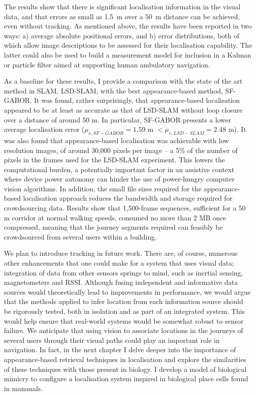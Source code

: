 The results show that there is significant localisation information in the visual data, and that errors as small as \SI{1.5}{m} over a \SI{50}{m} distance can be achieved, even without tracking. As mentioned above, the results have been reported in two ways: a) average absolute positional errors, and b) error distributions, both of which allow image descriptions to be assessed for their localisation capability.  The latter could also be used to build a measurement model for inclusion in a Kalman or particle filter  aimed at supporting human ambulatory navigation. 

As a baseline for these results, I provide a comparison with the state of the art method in SLAM, LSD-SLAM, with the best appearance-based method, SF-GABOR. It was found, rather surprisingly, that appearance-based localisation appeared to be at least as accurate as that of LSD-SLAM without loop closure over a distance of around 50 m. In particular, SF-GABOR presents a lower average localisation error ($\mu_{e,SF-GABOR} = 1.59 $ m $< \mu_{e,LSD-SLAM} = 2.48 $ m). It was also found that a\-ppea\-rance\--based localisation was achievable with low resolution images, of around 30,000 pixels per image -- a 5\% of the number of pixels in the frames used for the LSD-SLAM experiment. This lowers the computational burden, a potentially important factor in an assistive context where device power autonomy can hinder the use of power-hungry computer vision algorithms. In addition, the small file sizes required for the appearance-based localisation approach reduces the bandwidth and storage required for crowdsourcing data. Results show that 1,500-frame sequences, sufficient for a 50 m corridor at normal walking speeds, consumed no more than 2 MB once compressed, meaning that the journey segments required can feasibly be crowdsourced from several users within a building.

We plan to introduce tracking in future work. There are, of course, numerous other enhancements that one could make for a system that uses visual data; integration of data from other sensors springs to mind, such as inertial sensing, magnetometers and RSSI.  Although fusing independent and informative data sources would theoretically lead to improvements in performance, we would argue that the methods applied to infer location from each information source should be rigorously tested, both in isolation and as part of an integrated system.  This would help ensure that real-world systems would be somewhat robust to sensor failure. We anticipate that using vision to associate locations in the journeys of several users through their visual paths could play an important role in navigation. In fact, in the next chapter I delve deeper into the importance of appearance-based retrieval techniques in localisation and explore the similarities of these techniques with those present in biology. I develop a model of biological mimicry to configure a localisation system inspired in biological place cells found in mammals.


\label{sec:conclusion}


